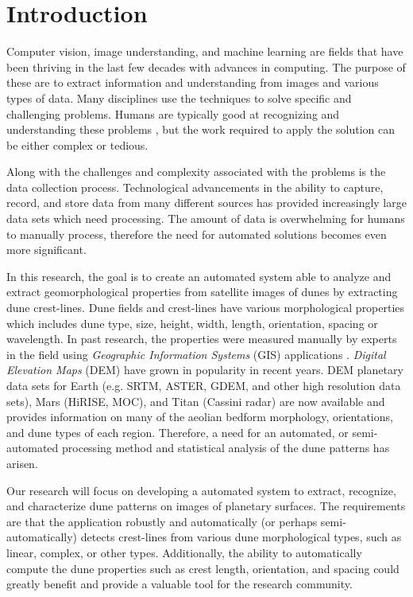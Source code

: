\section{Introduction}

Computer vision, image understanding, and machine learning are fields that have been thriving in the last few decades with advances in computing. The purpose of these are to extract information and understanding from images and various types of data. Many disciplines use the techniques to solve specific and challenging problems. Humans are typically good at recognizing and understanding these problems \cite{statistical-pattern-recognition}, but the work required to apply the solution can be either complex or tedious.

Along with the challenges and complexity associated with the problems is the data collection process. Technological advancements in the ability to capture, record, and store data from many different sources has provided increasingly large data sets which need processing. The amount of data is overwhelming for humans to manually process, therefore the need for automated solutions becomes even more significant.

In this research, the goal is to create an automated system able to analyze and extract geomorphological properties from satellite images of dunes by extracting dune crest-lines. Dune fields and crest-lines have various morphological properties which includes dune type, size, height, width, length, orientation, spacing or wavelength. In past research, the properties were measured manually by experts in the field using \emph{Geographic Information Systems} (GIS) applications \cite{ewing-kocurek-lake-2006,ewing-peyret-kocurek-bourke-2010,fenton-michaels-beyer-2014,fenton-michaels-chojnacki-beyer-2014,kocurek-ewing-2005}. \emph{Digital Elevation Maps} (DEM) have grown in popularity in recent years. DEM planetary data sets for Earth (e.g. SRTM, ASTER, GDEM, and other high resolution data sets), Mars (HiRISE, MOC), and Titan (Cassini radar) are now available and provides information on many of the aeolian bedform morphology, orientations, and dune types of each region. Therefore, a need for an automated, or semi-automated processing method and statistical analysis of the dune patterns has arisen.

Our research will focus on developing a automated system to extract, recognize, and characterize dune patterns on images of planetary surfaces. The requirements are that the application robustly and automatically (or perhaps semi-automatically) detects crest-lines from various dune morphological types, such as linear, complex, or other types. Additionally, the ability to automatically compute the dune properties such as crest length, orientation, and spacing could greatly benefit and provide a valuable tool for the research community.

